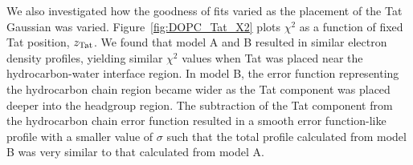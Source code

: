 We also investigated how the goodness of fits varied as the placement of 
the Tat Gaussian was varied. Figure~\ref{fig:DOPC_Tat_X2} plots $\chi^2$ as a 
function of fixed Tat position, $z_\textrm{Tat}$. We found that model A and B resulted 
in similar electron density profiles, yielding similar $\chi^2$ values 
when Tat was placed near the hydrocarbon-water interface region. In model B, 
the error function representing the hydrocarbon chain region became wider as the 
Tat component was placed deeper into the headgroup region. The subtraction
of the Tat component from the hydrocarbon chain error function resulted in 
a smooth error function-like profile with a smaller value of $\sigma$ such that
the total profile calculated from model B was very similar to that calculated 
from model A.
